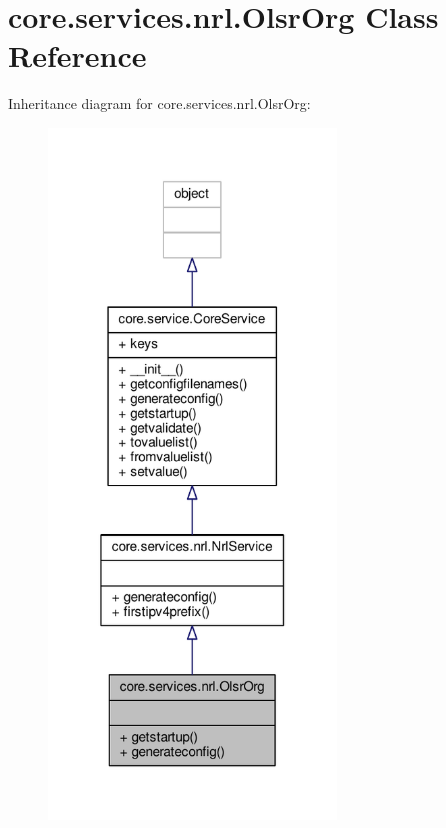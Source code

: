 \hypertarget{classcore_1_1services_1_1nrl_1_1_olsr_org}{\section{core.\+services.\+nrl.\+Olsr\+Org Class Reference}
\label{classcore_1_1services_1_1nrl_1_1_olsr_org}
}


Inheritance diagram for core.\+services.\+nrl.\+Olsr\+Org\+:
\nopagebreak
\begin{figure}[H]
\begin{center}
\leavevmode
\includegraphics[width=217pt]{classcore_1_1services_1_1nrl_1_1_olsr_org__inherit__graph}
\end{center}
\end{figure}


